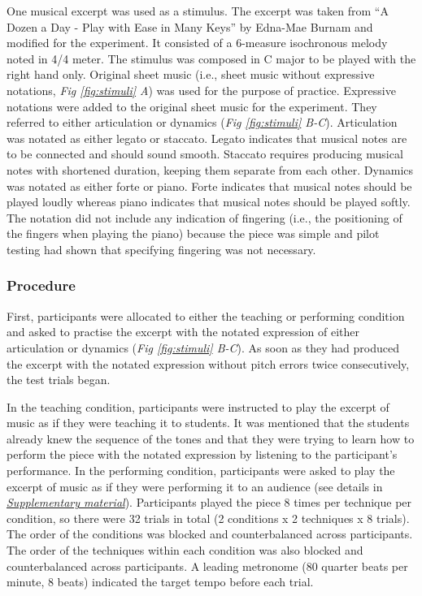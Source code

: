 \documentclass[
  man,floatsintext]{apa6}
\begin{document}
One musical excerpt was used as a stimulus. The excerpt was taken from ``A Dozen a Day - Play with Ease in Many Keys'' by Edna-Mae Burnam and modified for the experiment. It consisted of a 6-measure isochronous melody noted in 4/4 meter. The stimulus was composed in C major to be played with the right hand only. Original sheet music (i.e., sheet music without expressive notations, \emph{Fig \ref{fig:stimuli} A}) was used for the purpose of practice. Expressive notations were added to the original sheet music for the experiment. They referred to either articulation or dynamics (\emph{Fig \ref{fig:stimuli} B-C}). Articulation was notated as either legato or staccato. Legato indicates that musical notes are to be connected and should sound smooth. Staccato requires producing musical notes with shortened duration, keeping them separate from each other. Dynamics was notated as either forte or piano. Forte indicates that musical notes should be played loudly whereas piano indicates that musical notes should be played softly. The notation did not include any indication of fingering (i.e., the positioning of the fingers when playing the piano) because the piece was simple and pilot testing had shown that specifying fingering was not necessary.

\hypertarget{procedure}{%
\subsubsection{Procedure}\label{procedure}}

First, participants were allocated to either the teaching or performing condition and asked to practise the excerpt with the notated expression of either articulation or dynamics (\emph{Fig \ref{fig:stimuli} B-C}). As soon as they had produced the excerpt with the notated expression without pitch errors twice consecutively, the test trials began.

In the teaching condition, participants were instructed to play the excerpt of music as if they were teaching it to students. It was mentioned that the students already knew the sequence of the tones and that they were trying to learn how to perform the piece with the notated expression by listening to the participant's performance. In the performing condition, participants were asked to play the excerpt of music as if they were performing it to an audience (see details in \emph{\protect\hyperlink{supplementary}{Supplementary material}}). Participants played the piece 8 times per technique per condition, so there were 32 trials in total (2 conditions x 2 techniques x 8 trials). The order of the conditions was blocked and counterbalanced across participants. The order of the techniques within each condition was also blocked and counterbalanced across participants. A leading metronome (80 quarter beats per minute, 8 beats) indicated the target tempo before each trial.
\end{document}
